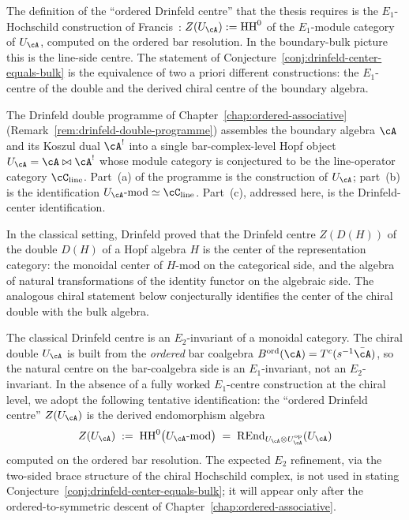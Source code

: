 The definition of the ``ordered Drinfeld centre'' that the
thesis requires is the $E_1$-Hochschild construction of
Francis~\cite{francis2013tangent}: $Z(U_\cA) := \mathrm{HH}^0$
of the $E_1$-module category of $U_\cA$, computed on the
ordered bar resolution. In the boundary-bulk picture this is
the line-side centre. The statement of
Conjecture~\ref{conj:drinfeld-center-equals-bulk} is the equivalence of
two a priori different constructions: the $E_1$-centre of the double and
the derived chiral centre of the boundary algebra.

The Drinfeld double programme of Chapter~\ref{chap:ordered-associative}
(Remark~\ref{rem:drinfeld-double-programme}) assembles the boundary
algebra $\cA$ and its Koszul dual $\cA^!$ into a single bar-complex-level
Hopf object $U_\cA = \cA \bowtie \cA^!$ whose module category is conjectured to be
the line-operator category $\cC_{\mathrm{line}}$. Part~(a) of the
programme is the construction of $U_\cA$; part~(b) is the identification
$U_\cA\text{-mod} \simeq \cC_{\mathrm{line}}$. Part~(c), addressed here,
is the Drinfeld-center identification.

In the classical setting, Drinfeld proved that the Drinfeld centre
$Z(D(H))$ of the double $D(H)$ of a Hopf algebra $H$ is the center of
the representation category: the monoidal center of $H\text{-mod}$ on
the categorical side, and the algebra of natural transformations of the
identity functor on the algebraic side. The analogous chiral statement
below conjecturally identifies the center of the chiral double with the
bulk algebra.

\begin{remark}
\label{rem:ordered-drinfeld-center-definition}
The classical Drinfeld centre is an $E_2$-invariant of a monoidal
category. The chiral double $U_\cA$ is built from the \emph{ordered}
bar coalgebra $B^{\mathrm{ord}}(\cA) = T^c(s^{-1}\bar\cA)$, so the
natural centre on the bar-coalgebra side is an $E_1$-invariant, not
an $E_2$-invariant. In the absence of a fully worked $E_1$-centre
construction at the chiral level, we adopt the following tentative
identification: the ``ordered Drinfeld centre'' $Z(U_\cA)$ is
the derived endomorphism algebra
\[
Z(U_\cA) \;:=\;
\mathrm{HH}^0\bigl(U_\cA\text{-mod}\bigr)
\;=\;
\mathrm{R}\!\operatorname{End}_{U_\cA\otimes U_\cA^{\mathrm{op}}}(U_\cA)
\]
computed on the ordered bar resolution. The expected $E_2$
refinement, via the two-sided brace structure of the chiral Hochschild
complex, is not used in stating
Conjecture~\ref{conj:drinfeld-center-equals-bulk}; it will appear
only after the ordered-to-symmetric descent of
Chapter~\ref{chap:ordered-associative}.
\end{remark}

